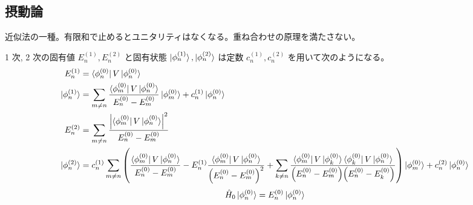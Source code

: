 \documentclass[uplatex,dvipdfmx,a4paper,11pt]{jlreq}
\theoremstyle{definition}
\begin{document}
\subsection{摂動論}
近似法の一種。有限和で止めるとユニタリティはなくなる。重ね合わせの原理を満たさない。
\begin{proposition}
  1 次, 2 次の固有値 $E_n^{(1)}, E_n^{(2)}$ と固有状態 $\ket{\phi_n^{(1)}}, \ket{\phi_n^{(2)}}$ は定数 $c_n^{(1)}, c_n^{(2)}$ を用いて次のようになる。
  \begin{align}
    E_n^{(1)}          & = \bra{\phi_n^{(0)}}V\ket{\phi_n^{(0)}}                                                                                                                                                                                                                                                                                                                                                             \\
    \ket{\phi_n^{(1)}} & = \sum_{m\neq n}\frac{\bra{\phi_m^{(0)}}V\ket{\phi_n^{(0)}}}{E_n^{(0)} - E_m^{(0)}}\ket{\phi_m^{(0)}} + c_n^{(1)}\ket{\phi_n^{(0)}}                                                                                                                                                                                                                                                                 \\
    E_n^{(2)}          & = \sum_{m\neq n}\frac{\qty|\bra{\phi_m^{(0)}}V\ket{\phi_n^{(0)}}|^2}{E_n^{(0)} - E_m^{(0)}}                                                                                                                                                                                                                                                                                                         \\
    \ket{\phi_n^{(2)}} & = c_n^{(1)}\sum_{m\neq n}\qty(\frac{\bra{\phi_m^{(0)}}V\ket{\phi_n^{(0)}}}{E_n^{(0)} - E_m^{(0)}} - E_n^{(1)}\frac{\bra{\phi_m^{(0)}}V\ket{\phi_n^{(0)}}}{\qty(E_n^{(0)} - E_m^{(0)})^2} + \sum_{k\neq n}\frac{\bra{\phi_m^{(0)}}V\ket{\phi_k^{(0)}}\bra{\phi_k^{(0)}}V\ket{\phi_n^{(0)}}}{\qty(E_n^{(0)} - E_m^{(0)})\qty(E_n^{(0)} - E_k^{(0)})})\ket{\phi_m^{(0)}} + c_n^{(2)}\ket{\phi_n^{(0)}}
  \end{align}
  \begin{align}
    \hat{H}_0\ket{\phi_n^{(0)}} = E_n^{(0)}\ket{\phi_n^{(0)}}
  \end{align}
\end{proposition}
\end{document}
